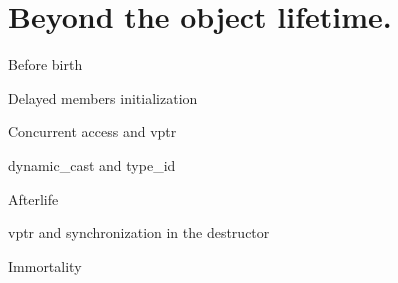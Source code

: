 \documentclass{panicsoftware-presentation}
\begin{document}
\section{Beyond the object lifetime.}

\begin{frame}{Before birth}

\end{frame}

\begin{frame}{Delayed members initialization}

\end{frame}

\begin{frame}{Concurrent access and vptr}

\end{frame}

\begin{frame}{dynamic\_cast and type\_id}

\end{frame}

\begin{frame}{Afterlife}

\end{frame}

\begin{frame}{vptr and synchronization in the destructor}

\end{frame}

\begin{frame}{Immortality}

\end{frame}
\end{document}

